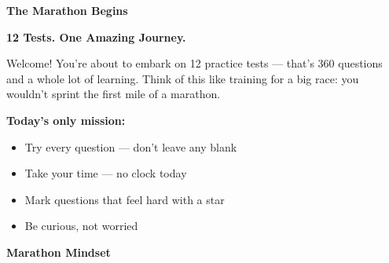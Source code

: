 \clearpage
\thispagestyle{empty}
{\sffamily

\begin{center}
{\fontsize{22}{26}\selectfont\bfseries\color{funBlue} \faRunning\hspace{3mm}The Marathon Begins\hspace{3mm}\faRunning}

\vspace{2mm}
{\color{funGray}\hrulefill}
\end{center}

\vspace{3mm}

\begin{tcolorbox}[
    enhanced,
    colback=funBlueLight,
    colframe=funBlue!50,
    arc=10pt,
    boxrule=1.5pt,
    left=6mm, right=6mm, top=5mm, bottom=5mm,
]
{\large\bfseries\color{funBlueDark} \faRoad\hspace{2mm}12 Tests. One Amazing Journey.}

\vspace{2mm}

Welcome! You're about to embark on 12 practice tests — that's 360 questions and a whole lot of learning. Think of this like training for a big race: you wouldn't sprint the first mile of a marathon.

\vspace{3mm}

\textbf{Today's only mission:}

\begin{itemize}[leftmargin=6mm, itemsep=3pt]
    \item[\textcolor{funBlue}{\faPencilAlt}] Try every question — don't leave any blank
    \item[\textcolor{funBlue}{\faPencilAlt}] Take your time — no clock today
    \item[\textcolor{funBlue}{\faPencilAlt}] Mark questions that feel hard with a star
    \item[\textcolor{funBlue}{\faPencilAlt}] Be curious, not worried
\end{itemize}
\end{tcolorbox}

\vspace{3mm}

\begin{tcolorbox}[
    enhanced,
    colback=funYellowLight,
    colframe=funYellow!60,
    arc=10pt,
    boxrule=1pt,
    left=6mm, right=6mm, top=4mm, bottom=4mm,
]
{\bfseries\color{funYellowDark} \faLightbulb\hspace{2mm}Marathon Mindset}


\end{tcolorbox}}

